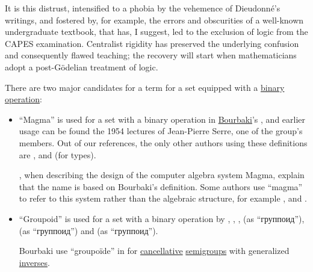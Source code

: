 \begin{remark}
\begin{displayquote}
    It is this distrust, intensified to a phobia by the vehemence of Dieudonn\'e's writings, and fostered by, for example, the errors and obscurities of a well-known undergraduate textbook, that has, I suggest, led to the exclusion of logic from the CAPES examination. Centralist rigidity has preserved the underlying confusion and consequently flawed teaching; the recovery will start when mathematicians adopt a post-G\"odelian treatment of logic.
  \end{displayquote}
\end{remark}

\begin{remark}\label{rem:magma_terminology}
  There are two major candidates for a term for a set equipped with a \hyperref[def:binary_operation]{binary operation}:
  \begin{itemize}
    \item \enquote{Magma} is used for a set with a binary operation in \hyperref[rem:bourbaki]{Bourbaki}'s \cite[def. A I.1]{Bourbaki1970Algèbre1à3}, and earlier usage can be found the 1954 lectures \cite[18]{Serre1992LieGroups} of Jean-Pierre Serre, one of the group's members. Out of our references, the only other authors using these definitions are ,  and  (for types).

    , when describing the design of the computer algebra system Magma, explain that the name is based on Bourbaki's definition. Some authors use \enquote{magma} to refer to this system rather than the algebraic structure, for example ,  and .

    \item \enquote{Groupoid} is used for a set with a binary operation by
    ,
    ,
    ,
     (as \enquote{группоид}),
     (as \enquote{группоид}) and
     (as \enquote{группоид}).

    Bourbaki use \enquote{groupo\"ide} in \cite[def. A I.127]{Bourbaki1970Algèbre1à3} for \hyperref[def:binary_operation/cancellative]{cancellative} \hyperref[def:semigroup]{semigroups} with generalized \hyperref[def:monoid_inverse]{inverses}.


\end{itemize}
\end{remark}
